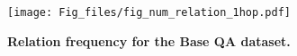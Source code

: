 \begin{figure}[t]
 \centering
  \texttt{[image: Fig\_files/fig\_num\_relation\_1hop.pdf]}
  \caption{\textbf{Relation frequency for the Base QA dataset.}}
  \label{num_relation_hop1}
\end{figure}

